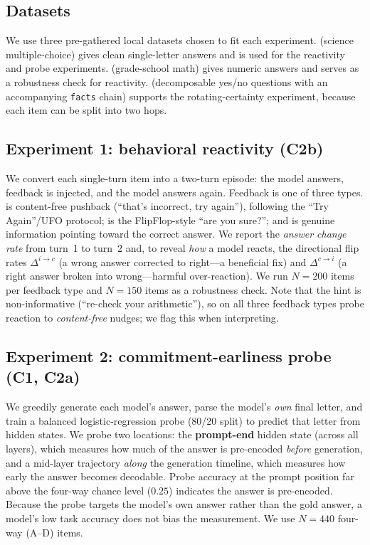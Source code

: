 \subsection{Datasets}
\label{sec:data}

We use three pre-gathered local datasets chosen to fit each experiment. \arc (science
multiple-choice) gives clean single-letter answers and is used for the reactivity and probe
experiments. \gsm (grade-school math) gives numeric answers and serves as a robustness check
for reactivity. \strat (decomposable yes/no questions with an accompanying \texttt{facts}
chain) supports the rotating-certainty experiment, because each item can be split into two
hops.

\subsection{Experiment 1: behavioral reactivity (C2b)}
\label{sec:exp1}

We convert each single-turn item into a two-turn episode: the model answers, feedback is
injected, and the model answers again. Feedback is one of three types. \generic is
content-free pushback (``that's incorrect, try again''), following the ``Try
Again''/UFO protocol; \challenge is the FlipFlop-style ``are you sure?''; and \hint is genuine
information pointing toward the correct answer. We report the \emph{answer change rate} from
turn~1 to turn~2 and, to reveal \emph{how} a model reacts, the directional flip rates
$\Delta^{i\rightarrow c}$ (a wrong answer corrected to right---a beneficial fix) and
$\Delta^{c\rightarrow i}$ (a right answer broken into wrong---harmful over-reaction). We run
$N=200$ \arc items per feedback type and $N=150$ \gsm items as a robustness check. Note that
the \gsm hint is non-informative (``re-check your arithmetic''), so on \gsm all three feedback
types probe reaction to \emph{content-free} nudges; we flag this when interpreting.

\subsection{Experiment 2: commitment-earliness probe (C1, C2a)}
\label{sec:exp2}

We greedily generate each model's answer, parse the model's \emph{own} final letter, and
train a balanced logistic-regression probe (80/20 split) to predict that letter from hidden
states. We probe two locations: the \textbf{prompt-end} hidden state (across all layers),
which measures how much of the answer is pre-encoded \emph{before} generation, and a
mid-layer trajectory \emph{along} the generation timeline, which measures how early the answer
becomes decodable. Probe accuracy at the prompt position far above the four-way chance level
($0.25$) indicates the answer is pre-encoded. Because the probe targets the model's own
answer rather than the gold answer, a model's low task accuracy does not bias the measurement.
We use $N=440$ four-way (A--D) \arc items.

